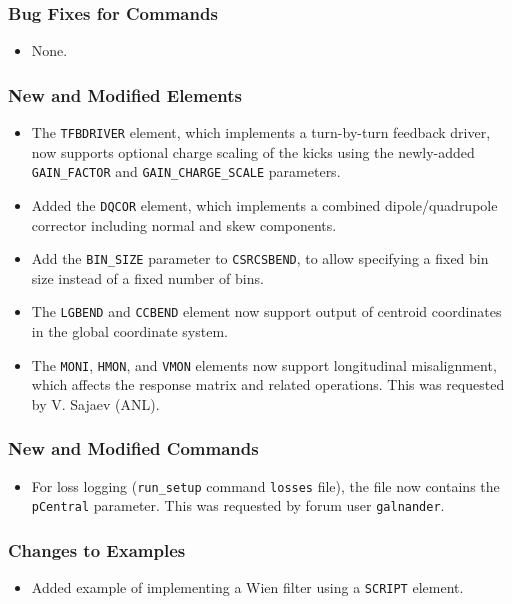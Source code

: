 \documentclass[11pt]{article}
\begin{document}
\subsubsection{Bug Fixes for Commands}
\begin{itemize}
\item None.
\end{itemize}

\subsubsection{New and Modified Elements}
\begin{itemize}
\item The \verb|TFBDRIVER| element, which implements a turn-by-turn feedback driver, now supports optional charge
  scaling of the kicks using the newly-added \verb|GAIN_FACTOR| and \verb|GAIN_CHARGE_SCALE| parameters.
\item Added the \verb|DQCOR| element, which implements a combined dipole/quadrupole corrector including normal
  and skew components.
\item Add the \verb|BIN_SIZE| parameter to \verb|CSRCSBEND|, to allow specifying a fixed bin size instead of a
  fixed number of bins.
\item The \verb|LGBEND| and \verb|CCBEND| element now support output of centroid coordinates in the global coordinate system.
\item The \verb|MONI|, \verb|HMON|, and \verb|VMON| elements now support longitudinal misalignment, which affects the
  response matrix and related operations. This was requested by V. Sajaev (ANL).
\end{itemize}

\subsubsection{New and Modified Commands}
\begin{itemize}
\item For loss logging (\verb|run_setup| command \verb|losses| file), the file now contains the
  \verb|pCentral| parameter.
  This was requested by forum user \verb|galnander|.
\end{itemize}

\subsubsection{Changes to Examples}

\begin{itemize}
\item Added example of implementing a Wien filter using a \verb|SCRIPT| element.
\end{itemize}
\end{document}
